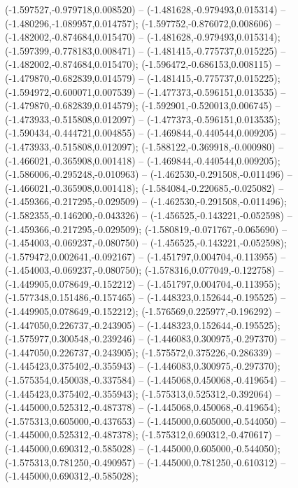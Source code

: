  (-1.597527,-0.979718,0.008520) -- (-1.481628,-0.979493,0.015314) -- (-1.480296,-1.089957,0.014757);
 (-1.597752,-0.876072,0.008606) -- (-1.482002,-0.874684,0.015470) -- (-1.481628,-0.979493,0.015314);
 (-1.597399,-0.778183,0.008471) -- (-1.481415,-0.775737,0.015225) -- (-1.482002,-0.874684,0.015470);
 (-1.596472,-0.686153,0.008115) -- (-1.479870,-0.682839,0.014579) -- (-1.481415,-0.775737,0.015225);
 (-1.594972,-0.600071,0.007539) -- (-1.477373,-0.596151,0.013535) -- (-1.479870,-0.682839,0.014579);
 (-1.592901,-0.520013,0.006745) -- (-1.473933,-0.515808,0.012097) -- (-1.477373,-0.596151,0.013535);
 (-1.590434,-0.444721,0.004855) -- (-1.469844,-0.440544,0.009205) -- (-1.473933,-0.515808,0.012097);
 (-1.588122,-0.369918,-0.000980) -- (-1.466021,-0.365908,0.001418) -- (-1.469844,-0.440544,0.009205);
 (-1.586006,-0.295248,-0.010963) -- (-1.462530,-0.291508,-0.011496) -- (-1.466021,-0.365908,0.001418);
 (-1.584084,-0.220685,-0.025082) -- (-1.459366,-0.217295,-0.029509) -- (-1.462530,-0.291508,-0.011496);
 (-1.582355,-0.146200,-0.043326) -- (-1.456525,-0.143221,-0.052598) -- (-1.459366,-0.217295,-0.029509);
 (-1.580819,-0.071767,-0.065690) -- (-1.454003,-0.069237,-0.080750) -- (-1.456525,-0.143221,-0.052598);
 (-1.579472,0.002641,-0.092167) -- (-1.451797,0.004704,-0.113955) -- (-1.454003,-0.069237,-0.080750);
 (-1.578316,0.077049,-0.122758) -- (-1.449905,0.078649,-0.152212) -- (-1.451797,0.004704,-0.113955);
 (-1.577348,0.151486,-0.157465) -- (-1.448323,0.152644,-0.195525) -- (-1.449905,0.078649,-0.152212);
 (-1.576569,0.225977,-0.196292) -- (-1.447050,0.226737,-0.243905) -- (-1.448323,0.152644,-0.195525);
 (-1.575977,0.300548,-0.239246) -- (-1.446083,0.300975,-0.297370) -- (-1.447050,0.226737,-0.243905);
 (-1.575572,0.375226,-0.286339) -- (-1.445423,0.375402,-0.355943) -- (-1.446083,0.300975,-0.297370);
 (-1.575354,0.450038,-0.337584) -- (-1.445068,0.450068,-0.419654) -- (-1.445423,0.375402,-0.355943);
 (-1.575313,0.525312,-0.392064) -- (-1.445000,0.525312,-0.487378) -- (-1.445068,0.450068,-0.419654);
 (-1.575313,0.605000,-0.437653) -- (-1.445000,0.605000,-0.544050) -- (-1.445000,0.525312,-0.487378);
 (-1.575312,0.690312,-0.470617) -- (-1.445000,0.690312,-0.585028) -- (-1.445000,0.605000,-0.544050);
 (-1.575313,0.781250,-0.490957) -- (-1.445000,0.781250,-0.610312) -- (-1.445000,0.690312,-0.585028);
